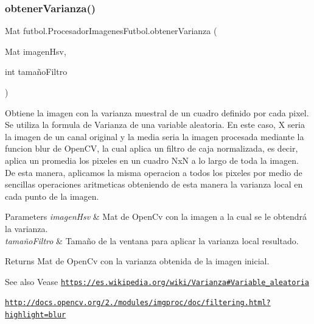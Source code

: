 \subsubsection{\texorpdfstring{obtener\+Varianza()}{obtenerVarianza()}}
{\footnotesize\ttfamily Mat futbol.\+Procesador\+Imagenes\+Futbol.\+obtener\+Varianza (\begin{DoxyParamCaption}\item[{Mat}]{imagen\+Hsv,  }\item[{int}]{tamaño\+Filtro }\end{DoxyParamCaption})\hspace{0.3cm}{\ttfamily [private]}}

Obtiene la imagen con la varianza muestral de un cuadro definido por cada pixel. Se utiliza la formula de Varianza de una variable aleatoria. En este caso, X seria la imagen de un canal original y la media seria la imagen procesada mediante la funcion blur de Open\+CV, la cual aplica un filtro de caja normalizada, es decir, aplica un promedia los pixeles en un cuadro NxN a lo largo de toda la imagen. De esta manera, aplicamos la misma operacion a todos los pixeles por medio de sencillas operaciones aritmeticas obteniendo de esta manera la varianza local en cada punto de la imagen. 
\begin{DoxyParams}{Parameters}
{\em imagen\+Hsv} & Mat de Open\+Cv con la imagen a la cual se le obtendrá la varianza. \\
\hline
{\em tamaño\+Filtro} & Tamaño de la ventana para aplicar la varianza local resultado. \\
\hline
\end{DoxyParams}
\begin{DoxyReturn}{Returns}
Mat de Open\+Cv con la varianza obtenida de la imagen inicial. 
\end{DoxyReturn}
\begin{DoxySeeAlso}{See also}
Vease \href{https://es.wikipedia.org/wiki/Varianza#Variable_aleatoria}{\tt https\+://es.\+wikipedia.\+org/wiki/\+Varianza\#\+Variable\+\_\+aleatoria} 

\href{http://docs.opencv.org/2.4/modules/imgproc/doc/filtering.html?highlight=blur}{\tt http\+://docs.\+opencv.\+org/2./modules/imgproc/doc/filtering.\+html?highlight=blur} 
\end{DoxySeeAlso}
\hypertarget{classfutbol_1_1_procesador_imagenes_futbol_a40be13ca858cf1ffacc446f2c271816e}{}\label{classfutbol_1_1_procesador_imagenes_futbol_a40be13ca858cf1ffacc446f2c271816e} 
